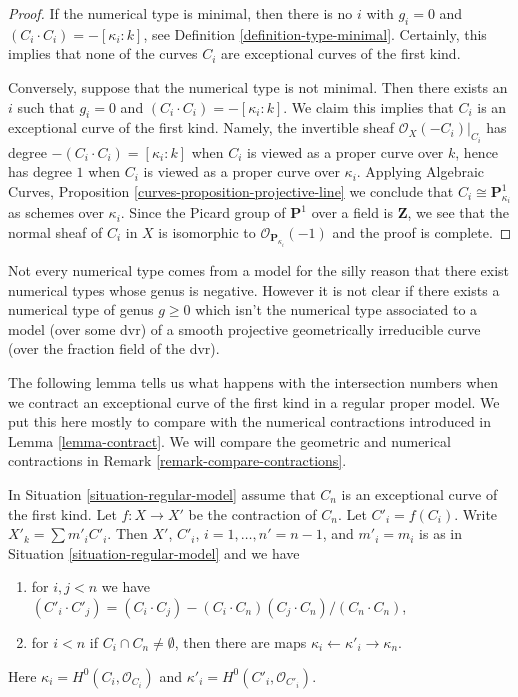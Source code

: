 \begin{proof}
If the numerical type is minimal, then there is no $i$ with
$g_i = 0$ and $(C_i \cdot C_i) = -[\kappa_i: k]$, see
Definition \ref{definition-type-minimal}.
Certainly, this implies that none of the curves $C_i$
are exceptional curves of the first kind.

\medskip\noindent
Conversely, suppose that the numerical type is not minimal.
Then there exists an $i$ such that $g_i = 0$ and
$(C_i \cdot C_i) = -[\kappa_i: k]$.
We claim this implies that $C_i$ is an exceptional curve
of the first kind. Namely, the invertible sheaf
$\mathcal{O}_X(-C_i)|_{C_i}$ has degree $-(C_i \cdot C_i) = [\kappa_i : k]$
when $C_i$ is viewed as a proper curve over $k$, hence
has degree $1$ when $C_i$ is viewed as a proper curve over $\kappa_i$.
Applying
Algebraic Curves, Proposition \ref{curves-proposition-projective-line}
we conclude that $C_i \cong \mathbf{P}^1_{\kappa_i}$ as schemes
over $\kappa_i$. Since the Picard group of $\mathbf{P}^1$
over a field is $\mathbf{Z}$, we see that the normal sheaf
of $C_i$ in $X$ is isomorphic to $\mathcal{O}_{\mathbf{P}_{\kappa_i}}(-1)$
and the proof is complete.
\end{proof}

\begin{remark}
\label{remark-numerical-type-not-from-model}
Not every numerical type comes from a model for the silly reason
that there exist numerical types whose genus is negative.
However it is not clear if there exists a numerical type
of genus $g \geq 0$ which isn't the numerical type associated to
a model (over some dvr) of a smooth projective geometrically
irreducible curve (over the fraction field of the dvr).
\end{remark}

\noindent
The following lemma tells us what happens with the intersection
numbers when we contract an exceptional curve of the first kind
in a regular proper model. We put this here mostly to compare with
the numerical contractions introduced in Lemma \ref{lemma-contract}.
We will compare the geometric and numerical contractions in
Remark \ref{remark-compare-contractions}.

\begin{lemma}
\label{lemma-blowdown-regular-model}
In Situation \ref{situation-regular-model} assume that $C_n$ is
an exceptional curve of the first kind. Let $f : X \to X'$ be the
contraction of $C_n$. Let $C'_i = f(C_i)$. Write $X'_k = \sum m'_i C'_i$.
Then $X'$, $C'_i$, $i = 1, \ldots, n' = n - 1$, and $m'_i = m_i$
is as in Situation \ref{situation-regular-model} and we have
\begin{enumerate}
\item for $i, j < n$ we have
$(C'_i \cdot C'_j) =
(C_i \cdot C_j) - (C_i \cdot C_n) (C_j \cdot C_n) /(C_n \cdot C_n)$,
\item for $i < n$ if $C_i \cap C_n \not = \emptyset$, then there are
maps $\kappa_i \leftarrow \kappa'_i \rightarrow \kappa_n$.
\end{enumerate}
Here $\kappa_i = H^0(C_i, \mathcal{O}_{C_i})$ and
$\kappa'_i = H^0(C'_i, \mathcal{O}_{C'_i})$.
\end{lemma}

